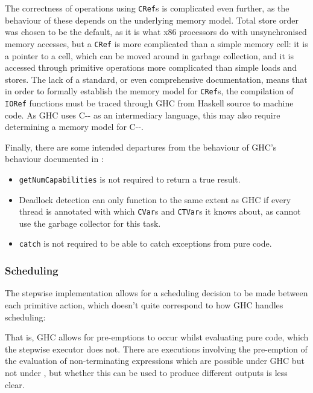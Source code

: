 The correctness of operations using \verb|CRef|s is complicated even
further, as the behaviour of these depends on the underlying memory
model. Total store order was chosen to be the default, as it is what
x86 processors do with unsynchronised memory accesses, but a
\verb|CRef| is more complicated than a simple memory cell: it is a
pointer to a cell, which can be moved around in garbage collection,
and it is accessed through primitive operations more complicated than
simple loads and stores. The lack of a standard, or even comprehensive
documentation, means that in order to formally establish the memory
model for \verb|CRef|s, the compilation of \verb|IORef| functions must
be traced through GHC from Haskell source to machine code. As GHC uses
C{-}{-} as an intermediary language, this may also require determining
a memory model for C{-}{-}.

Finally, there are some intended departures from the behaviour of
GHC's behaviour documented in :

\begin{itemize}
\item \verb|getNumCapabilities| is not required to return a true
  result.

\item Deadlock detection can only function to the same extent as GHC
  if every thread is annotated with which \verb|CVar|s and
  \verb|CTVar|s it knows about, as \dejafu{} cannot use the garbage
  collector for this task.

\item \verb|catch| is not required to be able to catch exceptions from
  pure code.
\end{itemize}

\subsubsection{Scheduling}
\label{sec:correctness-execution-scheduling}

The stepwise implementation allows for a scheduling decision to be
made between each primitive action, which doesn't quite correspond to
how GHC handles scheduling:


That is, GHC allows for pre-emptions to occur whilst evaluating pure
code, which the stepwise executor does not. There are executions
involving the pre-emption of the evaluation of non-terminating
expressions which are possible under GHC but not under \dejafu{}, but
whether this can be used to produce different outputs is less clear.
